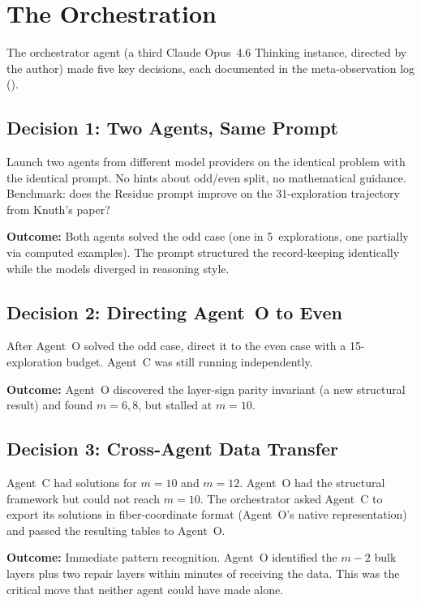 \documentclass[11pt]{article}
\theoremstyle{definition}
\theoremstyle{remark}
\begin{document}
\section{The Orchestration}
\label{sec:orchestration}

The orchestrator agent (a third Claude Opus~4.6 Thinking instance, directed by the author) made five key decisions, each documented in the meta-observation log ().

\subsection{Decision 1: Two Agents, Same Prompt}

Launch two agents from different model providers on the identical problem with the identical prompt. No hints about odd/even split, no mathematical guidance. Benchmark: does the Residue prompt improve on the 31-exploration trajectory from Knuth's paper?

\textbf{Outcome:} Both agents solved the odd case (one in 5~explorations, one partially via computed examples). The prompt structured the record-keeping identically while the models diverged in reasoning style.

\subsection{Decision 2: Directing Agent~O to Even}

After Agent~O solved the odd case, direct it to the even case with a 15-exploration budget. Agent~C was still running independently.

\textbf{Outcome:} Agent~O discovered the layer-sign parity invariant (a new structural result) and found $m = 6, 8$, but stalled at $m = 10$.

\subsection{Decision 3: Cross-Agent Data Transfer}

Agent~C had solutions for $m = 10$ and $m = 12$. Agent~O had the structural framework but could not reach $m = 10$. The orchestrator asked Agent~C to export its solutions in fiber-coordinate format (Agent~O's native representation) and passed the resulting tables to Agent~O.

\textbf{Outcome:} Immediate pattern recognition. Agent~O identified the $m-2$ bulk layers plus two repair layers within minutes of receiving the data. This was the critical move that neither agent could have made alone.
\end{document}
